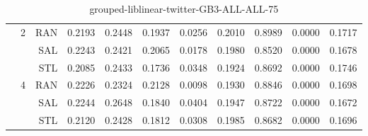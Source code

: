 \begin{center}
\begin{table}[htbp]
\begin{center}
\begin{tabular}{ | r | r | r | r | r | r | r | r | r | r | r |}
 & \multirow{3}{*}{2} & RAN & 0.2193 & 0.2448 & 0.1937 & 0.0256 & 0.2010 & 0.8989 & 0.0000 & 0.1717\\ \cline{3-11}
 &   & SAL & 0.2243 & 0.2421 & 0.2065 & 0.0178 & 0.1980 & 0.8520 & 0.0000 & 0.1678\\ \cline{3-11}
 &   & STL & 0.2085 & 0.2433 & 0.1736 & 0.0348 & 0.1924 & 0.8692 & 0.0000 & 0.1746\\ \cline{2-11}
 & \multirow{3}{*}{4} & RAN & 0.2226 & 0.2324 & 0.2128 & 0.0098 & 0.1930 & 0.8846 & 0.0000 & 0.1698\\ \cline{3-11}
 &   & SAL & 0.2244 & 0.2648 & 0.1840 & 0.0404 & 0.1947 & 0.8722 & 0.0000 & 0.1672\\ \cline{3-11}
 &   & STL & 0.2120 & 0.2428 & 0.1812 & 0.0308 & 0.1985 & 0.8682 & 0.0000 & 0.1696\\ \cline{2-11}
\hline
\end{tabular}
\caption{grouped-liblinear-twitter-GB3-ALL-ALL-75}
\end{center}
 \end{table}
\end{center}

